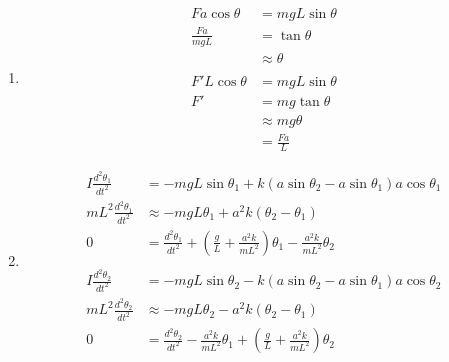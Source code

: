 \documentclass{article}
\begin{document}
\subsection{}

\begin{enumerate}
  \item

        \begin{align*}
          F a \cos \theta   & = m g L \sin \theta \\
          \frac{F a}{m g L} & = \tan \theta       \\
                            & \approx \theta      \\ \\
          F' L \cos \theta  & = m g L \sin \theta \\
          F'                & = m g \tan \theta   \\
                            & \approx mg \theta   \\
                            & = \frac{F a}{L}
        \end{align*}

  \item

        \begin{align*}
          I \frac{d^2 \theta_1}{d t^2}     & = -m g L \sin \theta_1 + k (a \sin \theta_2 - a \sin \theta_1) a \cos \theta_1                                          \\
          m L^2 \frac{d^2 \theta_1}{d t^2} & \approx -m g L \theta_1 + a^2 k (\theta_2 - \theta_1)                                                                   \\
          0                                & = \frac{d^2 \theta_1}{d t^2} + \left( \frac{g}{L} + \frac{a^2 k}{m L^2} \right) \theta_1 - \frac{a^2 k}{m L^2} \theta_2 \\ \\
          I \frac{d^2 \theta_2}{d t^2}     & = -m g L \sin \theta_2 - k (a \sin \theta_2 - a \sin \theta_1) a \cos \theta_2                                          \\
          m L^2 \frac{d^2 \theta_2}{d t^2} & \approx -m g L \theta_2 - a^2 k (\theta_2 - \theta_1)                                                                   \\
          0                                & = \frac{d^2 \theta_2}{d t^2} - \frac{a^2 k}{m L^2} \theta_1 + \left( \frac{g}{L} + \frac{a^2 k}{m L^2} \right) \theta_2
        \end{align*}


\end{enumerate}
\end{document}
